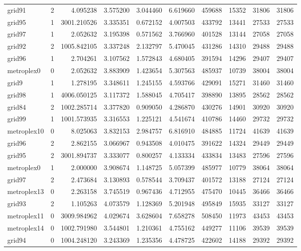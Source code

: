 \documentclass[../../../thesis.tex]{subfiles}
\begin{document}
\begin{longtable}{|l|r|r|r|r|r|r|r|r|r|}
grid91 & 2 & 4.095238 & 3.575200 & 3.044460 & 6.619660 & 459688 & 15352 & 31806 & 31806 \\
grid95 & 1 & 3001.210526 & 3.335351 & 0.672152 & 4.007503 & 433792 & 13441 & 27533 & 27533 \\
grid97 & 1 & 2.052632 & 3.195398 & 0.571562 & 3.766960 & 401528 & 13144 & 27058 & 27058 \\
grid92 & 2 & 1005.842105 & 3.337248 & 2.132797 & 5.470045 & 431286 & 14310 & 29488 & 29488 \\
grid96 & 1 & 2.704261 & 3.107562 & 1.572843 & 4.680405 & 391594 & 14296 & 29407 & 29407 \\
metroplex0 & 0 & 2.052632 & 3.883909 & 1.423654 & 5.307563 & 485937 & 10739 & 38004 & 38004 \\
grid9 & 1 & 1.278195 & 3.348611 & 1.245155 & 4.593766 & 429091 & 15271 & 31460 & 31460 \\
grid98 & 1 & 4006.050125 & 3.117372 & 1.588045 & 4.705417 & 398890 & 13895 & 28562 & 28562 \\
grid84 & 2 & 1002.285714 & 3.377820 & 0.909050 & 4.286870 & 430276 & 14901 & 30920 & 30920 \\
grid99 & 1 & 1001.573935 & 3.316553 & 1.225121 & 4.541674 & 410786 & 14460 & 29732 & 29732 \\
metroplex10 & 0 & 8.025063 & 3.832153 & 2.984757 & 6.816910 & 484885 & 11724 & 41639 & 41639 \\
grid96 & 2 & 2.862155 & 3.066967 & 0.943508 & 4.010475 & 391622 & 14324 & 29449 & 29449 \\
grid95 & 2 & 3001.894737 & 3.333077 & 0.800257 & 4.133334 & 433834 & 13483 & 27596 & 27596 \\
metroplex0 & 1 & 2.000000 & 3.908674 & 1.148725 & 5.057399 & 485977 & 10779 & 38064 & 38064 \\
grid97 & 2 & 2.473684 & 3.130893 & 0.578544 & 3.709437 & 401572 & 13188 & 27124 & 27124 \\
metroplex13 & 0 & 2.263158 & 3.745519 & 0.967436 & 4.712955 & 475470 & 10445 & 36466 & 36466 \\
grid93 & 2 & 1.105263 & 4.073579 & 1.128369 & 5.201948 & 495849 & 15935 & 33127 & 33127 \\
metroplex11 & 0 & 3009.984962 & 4.029674 & 3.628604 & 7.658278 & 508450 & 11973 & 43453 & 43453 \\
metroplex14 & 0 & 1002.791980 & 3.544801 & 1.210361 & 4.755162 & 449277 & 11106 & 39539 & 39539 \\
grid94 & 0 & 1004.248120 & 3.243369 & 1.235356 & 4.478725 & 422602 & 14188 & 29392 & 29392 \\

\end{longtable}
\end{document}
